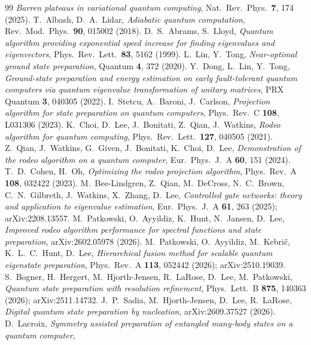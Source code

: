 \documentclass[
  aps,            %
  prc,            %
  reprint,        %
  superscriptaddress,
  floatfix,
  nofootinbib
]{revtex4-2}
\begin{document}
\begin{thebibliography}{99}
\textit{Barren plateaus in variational quantum computing},
Nat.\ Rev.\ Phys.\ \textbf{7}, 174 (2025).
T.~Albash, D.~A.~Lidar,
\textit{Adiabatic quantum computation},
Rev.\ Mod.\ Phys.\ \textbf{90}, 015002 (2018).
D.~S.~Abrams, S.~Lloyd,
\textit{Quantum algorithm providing exponential speed increase for finding
eigenvalues and eigenvectors},
Phys.\ Rev.\ Lett.\ \textbf{83}, 5162 (1999).
L.~Lin, Y.~Tong,
\textit{Near-optimal ground state preparation},
Quantum \textbf{4}, 372 (2020).
Y.~Dong, L.~Lin, Y.~Tong,
\textit{Ground-state preparation and energy estimation on early fault-tolerant
quantum computers via quantum eigenvalue transformation of unitary matrices},
PRX Quantum \textbf{3}, 040305 (2022).
I.~Stetcu, A.~Baroni, J.~Carlson,
\textit{Projection algorithm for state preparation on quantum computers},
Phys.\ Rev.\ C \textbf{108}, L031306 (2023).
K.~Choi, D.~Lee, J.~Bonitati, Z.~Qian, J.~Watkins,
\textit{Rodeo algorithm for quantum computing},
Phys.\ Rev.\ Lett.\ \textbf{127}, 040505 (2021).
Z.~Qian, J.~Watkins, G.~Given, J.~Bonitati, K.~Choi, D.~Lee,
\textit{Demonstration of the rodeo algorithm on a quantum computer},
Eur.\ Phys.\ J.\ A \textbf{60}, 151 (2024).
T.~D.~Cohen, H.~Oh,
\textit{Optimizing the rodeo projection algorithm},
Phys.\ Rev.\ A \textbf{108}, 032422 (2023).
M.~Bee-Lindgren, Z.~Qian, M.~DeCross, N.~C.~Brown, C.~N.~Gilbreth, J.~Watkins,
X.~Zhang, D.~Lee,
\textit{Controlled gate networks: theory and application to eigenvalue estimation},
Eur.\ Phys.\ J.\ A \textbf{61}, 263 (2025); arXiv:2208.13557.
M.~Patkowski, O.~Ayyildiz, K.~Hunt, N.~Jansen, D.~Lee,
\textit{Improved rodeo algorithm performance for spectral functions and state
preparation},
arXiv:2602.05978 (2026).
M.~Patkowski, O.~Ayyildiz, M.~Kebri\v{c}, K.~L.~C.~Hunt, D.~Lee,
\textit{Hierarchical fusion method for scalable quantum eigenstate preparation},
Phys.\ Rev.\ A \textbf{113}, 052442 (2026); arXiv:2510.19039.
S.~Bogner, H.~Hergert, M.~Hjorth-Jensen, R.~LaRose, D.~Lee, M.~Patkowski,
\textit{Quantum state preparation with resolution refinement},
Phys.\ Lett.\ B \textbf{875}, 140363 (2026); arXiv:2511.14732.
J.~P.~Sadia, M.~Hjorth-Jensen, D.~Lee, R.~LaRose,
\textit{Digital quantum state preparation by nucleation},
arXiv:2609.37527 (2026).
D.~Lacroix,
\textit{Symmetry assisted preparation of entangled many-body states on a quantum computer},

\end{thebibliography}
\end{document}
